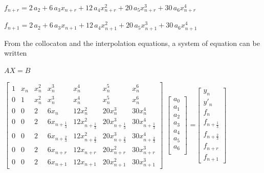 \documentclass[12pt]{article}
\begin{document}
\vspace{10pt}
$f_{n+r} = 2\,a_{{2}}+6\,a_{{3}} x_{n+r}+12\,a_{{4}} {x^{2}_{n+r}}+20\,
a_{{5}} {x^{3}_{n+r}}+30\,a_{{6}} {x^{4}_{n+r}}$


\vspace{10pt}
$f_{n+1} = 2\,a_{{2}}+6\,a_{{3}} x_{n+1}+12\,a_{{4}} {x^{2}_{n+1}}+20\,
a_{{5}} {x^{3}_{n+1}}+30\,a_{{6}} {x^{4}_{n+1}}$


\noindent From the collocaton and the interpolation equations, a system of equation can be written

\begin{center}
	$AX = B$
\end{center}



\vspace{20pt}


$\begin{bmatrix}
1 & x_{n} & x^{2}_{n} &  x^{3}_{n} & x^{4}_{n}& x^{5}_{n}& x^{6}_{n}\\
0 & 1 & x^{2}_{n} &  x^{3}_{n} & x^{4}_{n} & x^{5}_{n} & x^{6}_{n}\\
0&0 & 2 & 6x_n &  12x^2_{n} & 20x^{3}_{n} & 30 x^{4}_{n}\\
0&0 & 2 & 6x_{n+\frac{1}{3}} &  12x^2_{n+\frac{1}{3}} & 20x^{3}_{n+\frac{1}{3}} & 30 x^{4}_{n+\frac{1}{3}}\\
0&0 & 2 & 6x_{n+\frac{2}{3}} &  12x^2_{n+\frac{2}{3}} & 20x^{3}_{n+\frac{2}{3}} & 30 x^{4}_{n+\frac{2}{3}}\\
0 & 0&2 & 6x_{n+r} &  12x_{n+r} & 20x^{2}_{n+r} & 30 x^{3}_{n+r}\\
0 & 0&2 & 6x_{n+1} &  12x_{n+1} & 20x^{2}_{n+1} & 30 x^{3}_{n+1}
\end{bmatrix}$
$\begin{bmatrix} a_{0}\\ a_{1} \\ a_{2} \\ a_{3}\\ a_{4}\\ a_{5}\\ a_{6}\\ \end{bmatrix}$
=$\begin{bmatrix} y_{n}\\ y'_{n} \\ f_{n}\\ f_{n+\frac{1}{3}}\\ f_{n+\frac{2}{3}}\\ f_{n+r} \\ f_{n+1}
\end{bmatrix}$\\
\end{document}
